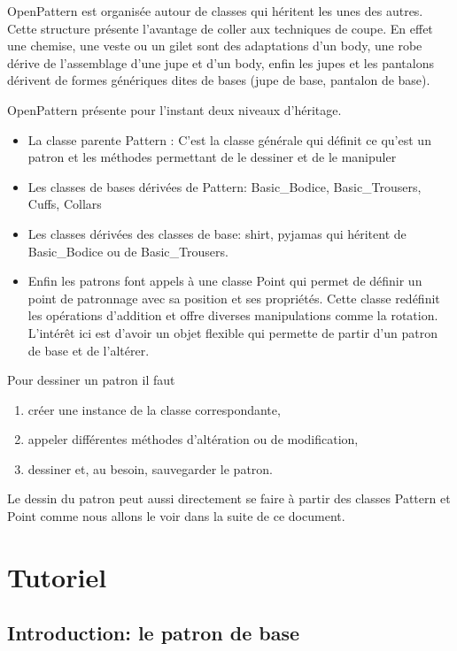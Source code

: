 \documentclass[10pt,a4paper,twoside]{report}
\begin{document}
OpenPattern est organisée autour de classes qui héritent les unes des autres. Cette structure présente l'avantage de coller aux techniques de coupe. En effet une chemise, une veste ou un gilet sont des adaptations d'un body, une robe dérive de l'assemblage d'une jupe et d'un body, enfin les jupes et les pantalons dérivent de formes génériques dites de bases (jupe de base, pantalon de base).

OpenPattern présente pour l'instant deux niveaux d'héritage.
\begin{itemize}
\item La classe parente Pattern : C'est la classe générale qui définit ce qu'est un patron et les méthodes permettant de le dessiner et de le manipuler
\item Les classes de bases dérivées de Pattern: Basic\_Bodice, Basic\_Trousers, Cuffs, Collars
\item Les classes dérivées des classes de base: shirt, pyjamas qui héritent de Basic\_Bodice ou de Basic\_Trousers. \item Enfin les patrons font appels à une classe Point qui permet de définir un point de patronnage avec sa position et ses propriétés. Cette classe redéfinit les opérations d'addition et offre diverses manipulations  comme la rotation. L'intérêt ici est d'avoir un objet flexible qui permette de partir d'un patron de base et de l'altérer.
\end{itemize}

Pour dessiner un patron il faut
\begin{enumerate}
\item créer une instance de la classe correspondante,
\item appeler différentes méthodes d'altération ou de modification,
\item dessiner et, au besoin, sauvegarder le patron.
\end{enumerate}

Le dessin du patron peut aussi  directement se faire à partir des classes Pattern et Point comme nous allons le voir dans la suite de ce document.

\chapter{Tutoriel}



\section{Introduction: le patron de base}
\end{document}
